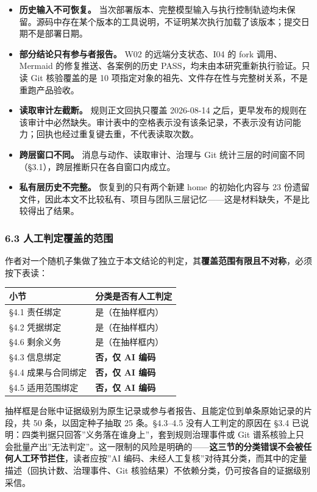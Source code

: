 \documentclass[
]{article}
\newcounter{none} %
\providecommand{\tightlist}{%
  \setlength{\itemsep}{0pt}\setlength{\parskip}{0pt}}
\begin{document}
\begin{itemize}
\tightlist
\item
  \textbf{历史输入不可恢复。}
  当次部署版本、完整模型输入与执行控制轨迹均未保留。源码中存在某个版本的工具说明，不证明某次执行加载了该版本；提交日期不是部署日期。
\item
  \textbf{部分结论只有参与者报告。} W02 的远端分支状态、I04 的 fork
  调用、Mermaid 的修复推送、各案例的历史
  PASS，均未由本研究重新执行验证。只读 Git 核验覆盖的是 10
  项指定对象的祖先、文件存在性与完整树关系，不是重跑产品验收。
\item
  \textbf{读取审计左截断。} 规则正文回执只覆盖 2026-08-14
  之后，更早发布的规则在该审计中必然缺失。审计表中的空格表示没有该条记录，不表示没有访问能力；回执也经过重复键去重，不代表读取次数。
\item
  \textbf{跨层窗口不同。} 消息与动作、读取审计、治理与 Git
  统计三层的时间窗不同（§3.1），跨层推断只在各自窗口内成立。
\item
  \textbf{私有层历史不完整。} 恢复到的只有两个新建 home 的初始化内容与
  23
  份遗留文件，因此本文不比较私有、项目与团队三层记忆------这是材料缺失，不是比较得出了结果。
\end{itemize}

\subsubsection{6.3
人工判定覆盖的范围}\label{ux4ebaux5de5ux5224ux5b9aux8986ux76d6ux7684ux8303ux56f4}

作者对一个随机子集做了独立于本文结论的判定，其\textbf{覆盖范围有限且不对称}，必须按下表读：

{\def\LTcaptype{none} %
\begin{longtable}[]{@{}ll@{}}
\toprule\noalign{}
小节 & 分类是否有人工判定 \\
\midrule\noalign{}
\endhead
\bottomrule\noalign{}
\endlastfoot
§4.1 责任绑定 & 是（在抽样框内） \\
§4.2 凭据绑定 & 是（在抽样框内） \\
§4.6 剩余义务 & 是（在抽样框内） \\
§4.3 信息绑定 & \textbf{否，仅 AI 编码} \\
§4.4 成果与合同绑定 & \textbf{否，仅 AI 编码} \\
§4.5 适用范围绑定 & \textbf{否，仅 AI 编码} \\
\end{longtable}
}

抽样框是台账中证据级别为原生记录或参与者报告、且能定位到单条原始记录的片段，共
50 条，以固定种子抽取 25 条。§4.3--4.5 没有人工判定的原因在 §3.4
已说明：四类判据只回答''义务落在谁身上''，套到规则治理事件或 Git
谱系核验上只会批量产出''无法判定''。这一限制的风险是明确的------\textbf{这三节的分类错误不会被任何人工环节拦住}，读者应按''AI
编码、未经人工复核''对待其分类，而其中的定量描述（回执计数、治理事件、Git
核验结果）不依赖分类，仍可按各自的证据级别采信。
\end{document}
